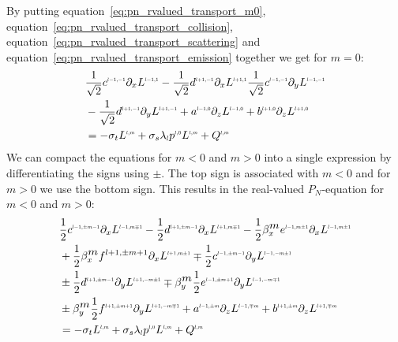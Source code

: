 By putting equation~\ref{eq:pn_rvalued_transport_m0}, equation~\ref{eq:pn_rvalued_transport_collision}, equation~\ref{eq:pn_rvalued_transport_scattering} and equation~\ref{eq:pn_rvalued_transport_emission} together we get for $m=0$:
\begin{align}
&
\frac{1}{\sqrt{2}}c^{\scaleto{l-1,-1}{4pt}}\partial_x L^{\scaleto{l-1,1}{4pt}}
-\frac{1}{\sqrt{2}}d^{\scaleto{l+1,-1}{4pt}}\partial_x L^{\scaleto{l+1,1}{4pt}}
\frac{1}{\sqrt{2}}c^{\scaleto{l-1,-1}{4pt}}\partial_y L^{\scaleto{l-1,-1}{4pt}}
\nonumber
\\&
-\frac{1}{\sqrt{2}}d^{\scaleto{l+1,-1}{4pt}}\partial_y L^{\scaleto{l+1,-1}{4pt}}
+a^{\scaleto{l-1,0}{4pt}}\partial_z L^{\scaleto{l-1,0}{4pt}}
+b^{\scaleto{l+1,0}{4pt}}\partial_z L^{\scaleto{l+1,0}{4pt}}
\nonumber
\\&
=
-\sigma_t L^{\scaleto{l,m}{4pt}}
+\sigma_s\lambda_{\scaleto{l}{4pt}}p^{\scaleto{l,0}{4pt}}L^{\scaleto{l,m}{4pt}}
+ Q^{\scaleto{l,m}{4pt}}
\end{align}
We can compact the equations for $m<0$ and $m>0$ into a single expression by differentiating the signs using $\pm$. The  top sign is associated with $m<0$ and for $m>0$ we use the bottom sign. This results in the real-valued $P_N$-equation for $m<0$ and $m>0$:
\begin{align}
&
\frac{1}{2}c^{\scaleto{l-1,\pm m-1}{4pt}}\partial_x L^{\scaleto{l-1,m\mp 1}{4pt}}
-\frac{1}{2}d^{\scaleto{l+1,\pm m-1}{4pt}}\partial_x L^{\scaleto{l+1,m\mp 1}{4pt}}
-\frac{1}{2}\beta_x^{\scaleto{m}{4pt}}e^{\scaleto{l-1,m\pm 1}{4pt}}\partial_x L^{\scaleto{l-1,m\pm 1}{4pt}}
\nonumber
\\&
+\frac{1}{2}\beta_x^{\scaleto{m}{4pt}}f^{l+1,\pm m+1}\partial_x L^{\scaleto{l+1,m\pm 1}{4pt}}
\mp \frac{1}{2}c^{\scaleto{l-1,\pm m-1}{4pt}}\partial_y L^{\scaleto{l-1,-m\pm 1}{4pt}}
\nonumber
\\&
\pm \frac{1}{2}d^{\scaleto{l+1,\pm m-1}{4pt}}\partial_y L^{\scaleto{l+1,-m \pm 1}{4pt}}
\mp \beta_y^{\scaleto{m}{4pt}}\frac{1}{2}e^{\scaleto{l-1,\pm m+1}{4pt}}\partial_y L^{\scaleto{l-1,-m\mp 1}{4pt}}
\nonumber
\\&
\pm \beta_y^{\scaleto{m}{4pt}}\frac{1}{2}f^{\scaleto{l+1,\pm m+1}{4pt}}\partial_y L^{\scaleto{l+1,-m\mp 1}{4pt}}
+a^{\scaleto{l-1,\pm m}{4pt}}\partial_z L^{\scaleto{l-1,\mp m}{4pt}}
+b^{\scaleto{l+1,\pm m}{4pt}}\partial_z L^{\scaleto{l+1,\mp m}{4pt}}
\nonumber
\\&
=
-\sigma_t L^{\scaleto{l,m}{4pt}}
+\sigma_s\lambda_{\scaleto{l}{4pt}}p^{\scaleto{l,0}{4pt}}L^{\scaleto{l,m}{4pt}}
+Q^{\scaleto{l,m}{4pt}}
\end{align}
